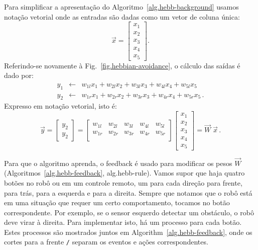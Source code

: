 Para simplificar a apresentação do Algoritmo~\ref{alg.hebb-background} usamos notação vetorial onde as entradas são dadas como um vetor de coluna única:
\[
\vec{x} = \left[ \begin{array}{c} x_1\\x_2\\x_3\\x_4\\x_5 \end{array} \right].
\]
Referindo-se novamente à Fig.~\ref{fig.hebbian-avoidance}, o cálculo das saídas é dado por:
\begin{eqnarray}
y_1 & \leftarrow & w_{1l}x_1 + w_{2l}x_2 + w_{3l}x_3 + w_{4l}x_4 + w_{5l}x_5\label{eqn.yl}\\
y_2 & \leftarrow & w_{1r}x_1 + w_{2r}x_2 + w_{3r}x_3 + w_{4r}x_4 + w_{5r}x_5\label{eqn.yr}\,.
\end{eqnarray}
Expresso em notação vetorial, isto é:
\begin{equation}\label{eqn.hebbian}
\vec{y} =
\left[ \begin{array}{c} y_2\\y_2 \end{array} \right] =
\left[
  \begin{array}{ccccc}
    w_{1l} & w_{2l} & w_{3l} & w_{4l} & w_{5l} \\
    w_{1r} & w_{2r} & w_{3r} & w_{4r} & w_{5r} \\
\end{array}
\right]
\left[ \begin{array}{c} x_1\\x_2\\x_3\\x_4\\x_5 \end{array} \right] =
\vec{W}\;\vec{x}\,.
\end{equation}

Para que o algoritmo aprenda, o feedback é usado para modificar os pesos $\vec{W}$ (Algoritmos~\ref{alg.hebb-feedback}, {alg.hebb-rule}). Vamos supor que haja quatro botões no robô ou em um controle remoto, um para cada direção para frente, para trás, para a esquerda e para a direita. Sempre que notamos que o robô está em uma situação que requer um certo comportamento, tocamos no botão correspondente. Por exemplo, se o sensor esquerdo detectar um obstáculo, o robô deve virar à direita. Para implementar isto, há um processo para cada botão. Estes processos são mostrados juntos em Algorithm~\ref{alg.hebb-feedback}, onde os cortes para a frente \verb+/+ separam os eventos e ações correspondentes.


